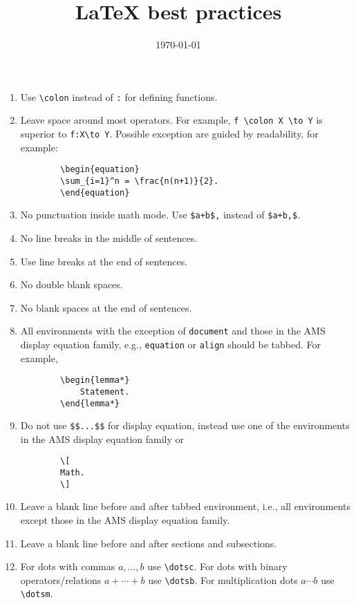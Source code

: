 \documentclass{amsart}
\title{{\LaTeX} best practices}
\date{\today}
\begin{document}
	\maketitle
	
	\begin{enumerate}[1)]
		\item Use \verb|\colon| instead of \verb|:| for defining functions.
		
		\item Leave space around most operators.
		For example, \verb|f \colon X \to Y| is superior to \verb|f:X\to Y|.
		Possible exception are guided by readability, for example:
		\begin{verbatim}
		\begin{equation}
		\sum_{i=1}^n = \frac{n(n+1)}{2}.
		\end{equation}
		\end{verbatim}
		
		\item No punctuation inside math mode.
		Use \verb|$a+b$,| instead of \verb|$a+b,$|.
		
		\item No line breaks in the middle of sentences.
		
		\item Use line breaks at the end of sentences.
		
		\item No double blank spaces.
		
		\item No blank spaces at the end of sentences.
		
		\item All environments with the exception of \verb|document| and those in the AMS display equation family, e.g., \verb|equation| or \verb|align| should be tabbed.
		For example,
		\begin{verbatim}
		\begin{lemma*}
		    Statement.
		\end{lemma*}
		\end{verbatim}
		
		\item Do not use \verb|$$...$$| for display equation, instead use one of the environments in the AMS display equation family or
		\begin{verbatim}
		\[
		Math.
		\]
		\end{verbatim}
		
		\item Leave a blank line before and after tabbed environment, i.e., all environments except those in the AMS display equation family.
		
		\item Leave a blank line before and after sections and subsections.
		
		\item For dots with commas $a, \dotsc, b$ use \verb|\dotsc|.
		For dots with binary operators/relations $a + \dotsb + b$ use \verb|\dotsb|.
		For multiplication dots $a \dotsm b$ use \verb|\dotsm|.
	\end{enumerate}
\end{document}

